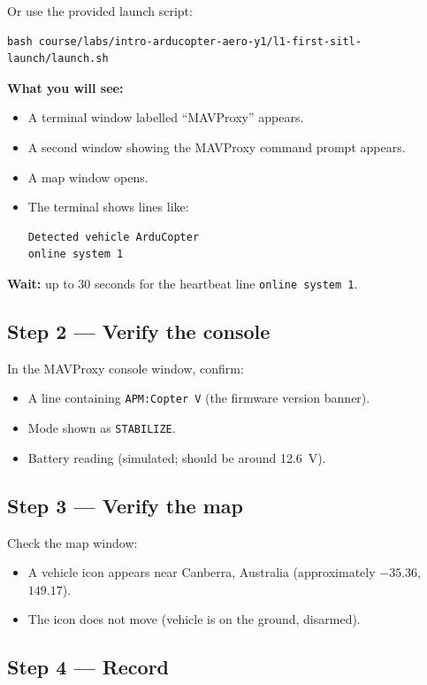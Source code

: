 \documentclass[a4paper,11pt,twoside]{article}
\begin{document}
Or use the provided launch script:

\begin{Verbatim}[frame=single,fontsize=\small]
bash course/labs/intro-arducopter-aero-y1/l1-first-sitl-launch/launch.sh
\end{Verbatim}

\textbf{What you will see:}
\begin{itemize}
  \item A terminal window labelled ``MAVProxy'' appears.
  \item A second window showing the MAVProxy command prompt appears.
  \item A map window opens.
  \item The terminal shows lines like:
\begin{Verbatim}[frame=single,fontsize=\small]
Detected vehicle ArduCopter
online system 1
\end{Verbatim}
\end{itemize}

\textbf{Wait:} up to 30 seconds for the heartbeat line \texttt{online system 1}.

\subsection*{Step 2 --- Verify the console}

In the MAVProxy console window, confirm:
\begin{itemize}
  \item A line containing \texttt{APM:Copter V} (the firmware version banner).
  \item Mode shown as \texttt{STABILIZE}.
  \item Battery reading (simulated; should be around 12.6~V).
\end{itemize}

\subsection*{Step 3 --- Verify the map}

Check the map window:
\begin{itemize}
  \item A vehicle icon appears near Canberra, Australia (approximately $-35.36$, $149.17$).
  \item The icon does not move (vehicle is on the ground, disarmed).
\end{itemize}

\subsection*{Step 4 --- Record}
\end{document}
